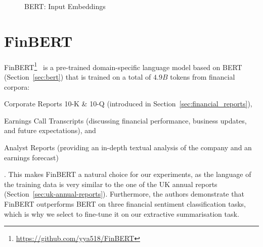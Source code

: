 \begin{figure}[ht]
    \caption{BERT: Input Embeddings}
    \label{fig:bert_input}
\end{figure}

\section{FinBERT}\label{sec:finbert}
FinBERT\footnote{\url{https://github.com/yya518/FinBERT}}~\cite{yang2020finbert} is a pre-trained domain-specific language model based on
BERT~\cite{devlin-etal-2019-bert} (Section~\ref{sec:bert}) that is trained on a total of $4.9B$ tokens from financial corpora:
\begin{enumerate*}
    \item Corporate Reports 10-K \& 10-Q (introduced in Section~\ref{sec:financial_reports}),
    \item Earnings Call Transcripts (discussing financial performance, business updates, and future expectations), and
    \item Analyst Reports (providing an in-depth textual analysis of the company and an earnings forecast)
\end{enumerate*}.
This makes FinBERT a natural choice for our experiments, as the language of the training data is very similar to the one of the UK annual reports (Section~\ref{sec:uk-annual-reports}).
Furthermore, the authors demonstrate that FinBERT outperforms BERT on three financial sentiment classification tasks, which is why we select to fine-tune it on our extractive summarisation task.

